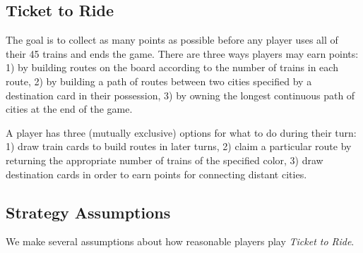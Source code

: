 \subsection{Ticket to Ride}
The goal is to collect as many points as possible before
any player uses all of their 45 trains and ends the game.
There are three ways players may earn points:
1) by building routes on the board
according to the number of trains in each route,
2) by building a path of routes
between two cities specified by a destination card in their possession,
3) by owning the longest continuous path of cities at the end of the game.

A player has three (mutually exclusive) options for what to do during
their turn:
1) draw train cards to build routes in later turns,
2) claim a particular route by returning the appropriate
number of trains of the specified color,
3) draw destination cards in order to earn points for connecting
distant cities.
\subsection{Strategy Assumptions}
We make several assumptions about how reasonable players
play \textit{Ticket to Ride}.